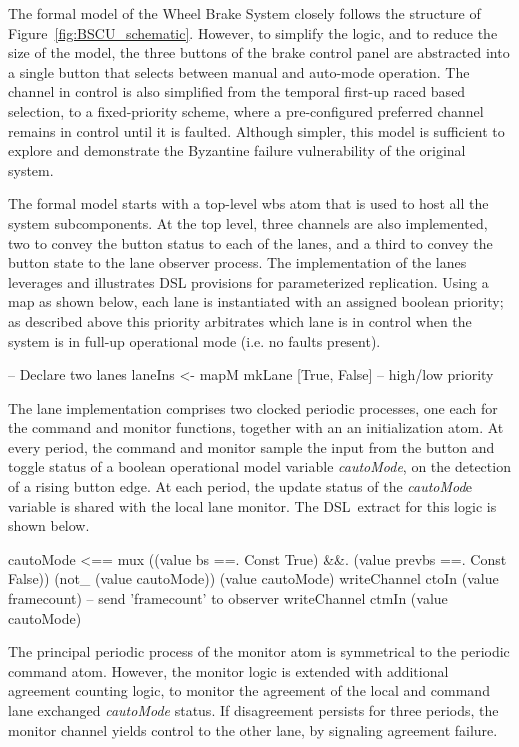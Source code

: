 

The formal model  of the  Wheel Brake System closely follows the structure of Figure~\ref{fig:BSCU_schematic}.
However, to simplify the logic, and to reduce the size of the model, the
three buttons of the brake control panel are abstracted into a single button
that selects between manual and auto-mode operation.  The channel in control
is also simplified from the temporal first-up raced based selection, to a  fixed-priority scheme, where a pre-configured preferred channel remains in control
until it is faulted. Although simpler, this model is sufficient to explore and demonstrate the Byzantine failure vulnerability of the original system. 

The formal model starts with a top-level wbs atom that is used
to host all the system subcomponents. At the top level, three channels
are also implemented, two to convey the button status to each of the lanes,
and a third to convey the button state to the lane observer process.
The   implementation of the lanes leverages and illustrates DSL provisions for parameterized replication.
 Using a map as shown below,  each lane is instantiated with an assigned boolean  priority;  as described above   this priority arbitrates which lane is in control when the system is in full-up operational mode (i.e. no faults present).

\begin{lima}
 -- Declare two lanes
  laneIns <- mapM mkLane [True, False]  -- high/low priority
\end{lima}

 The lane implementation comprises two clocked periodic processes, one each for the  command and monitor  functions, together with an  an initialization  atom. At every period, the command and monitor sample the input from the button and toggle status of a boolean  operational model variable \textit{cautoMode},  on the detection of a rising button edge.  At each period, the update status of the \textit{cautoMod}e variable is shared with the local lane monitor.
 The DSL\ extract for this logic is shown below.



\begin{lima}

   cautoMode <== mux ((value bs ==. Const True) &&.
                       (value prevbs ==. Const False))
                      (not_ (value cautoMode))
                      (value cautoMode)
    writeChannel ctoIn (value framecount)  -- send 'framecount' to observer
    writeChannel ctmIn (value cautoMode)
      
\end{lima}
  The principal periodic process of the monitor atom is symmetrical to the periodic command atom. However, the monitor logic is extended with additional agreement counting logic, to monitor the agreement of the local and  command lane exchanged   \emph{cautoMode}  status. If disagreement persists   for three periods, the  monitor channel yields control to the other lane, by signaling  agreement failure.  

